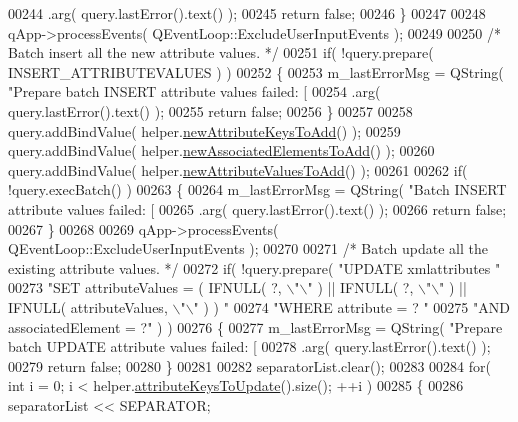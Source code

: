 \begin{DoxyCode}
{{{{{{{{00244         .arg( query.lastError().text() );
00245     \textcolor{keywordflow}{return} \textcolor{keyword}{false};
00246   \}
00247 
00248   qApp->processEvents( QEventLoop::ExcludeUserInputEvents );
00249 
00250   \textcolor{comment}{/* Batch insert all the new attribute values. */}
00251   \textcolor{keywordflow}{if}( !query.prepare( INSERT\_ATTRIBUTEVALUES ) )
00252   \{
00253     m\_lastErrorMsg = QString( \textcolor{stringliteral}{"Prepare batch INSERT attribute values failed:
       [%
00254         .arg( query.lastError().text() );
00255     \textcolor{keywordflow}{return} \textcolor{keyword}{false};
00256   \}
00257 
00258   query.addBindValue( helper.\hyperlink{class_g_c_batch_processor_helper_a605ca53123f28467df39cabeb3aa65cd}{newAttributeKeysToAdd}() );
00259   query.addBindValue( helper.\hyperlink{class_g_c_batch_processor_helper_abf195046fd00e629b2ce5e3bd6bcf90d}{newAssociatedElementsToAdd}() );
00260   query.addBindValue( helper.\hyperlink{class_g_c_batch_processor_helper_af06d87d433f9402667f1cd654ad4b422}{newAttributeValuesToAdd}() );
00261 
00262   \textcolor{keywordflow}{if}( !query.execBatch() )
00263   \{
00264     m\_lastErrorMsg = QString( \textcolor{stringliteral}{"Batch INSERT attribute values failed: [%
00265         .arg( query.lastError().text() );
00266     \textcolor{keywordflow}{return} \textcolor{keyword}{false};
00267   \}
00268 
00269   qApp->processEvents( QEventLoop::ExcludeUserInputEvents );
00270 
00271   \textcolor{comment}{/* Batch update all the existing attribute values. */}
00272   \textcolor{keywordflow}{if}( !query.prepare( \textcolor{stringliteral}{"UPDATE xmlattributes "}
00273                       \textcolor{stringliteral}{"SET attributeValues = ( IFNULL( ?, \(\backslash\)"\(\backslash\)" ) || IFNULL( ?, 
      \(\backslash\)"\(\backslash\)" ) || IFNULL( attributeValues, \(\backslash\)"\(\backslash\)" ) ) "}
00274                       \textcolor{stringliteral}{"WHERE attribute = ? "}
00275                       \textcolor{stringliteral}{"AND associatedElement = ?"} ) )
00276   \{
00277     m\_lastErrorMsg = QString( \textcolor{stringliteral}{"Prepare batch UPDATE attribute values failed:
       [%
00278         .arg( query.lastError().text() );
00279     \textcolor{keywordflow}{return} \textcolor{keyword}{false};
00280   \}
00281 
00282   separatorList.clear();
00283 
00284   \textcolor{keywordflow}{for}( \textcolor{keywordtype}{int} i = 0; i < helper.\hyperlink{class_g_c_batch_processor_helper_a4cad81bffaa5af1531a72ccaeaedd600}{attributeKeysToUpdate}().size(); ++i )
00285   \{
00286     separatorList << SEPARATOR;
}}}}}}}}}}}
\end{DoxyCode}
